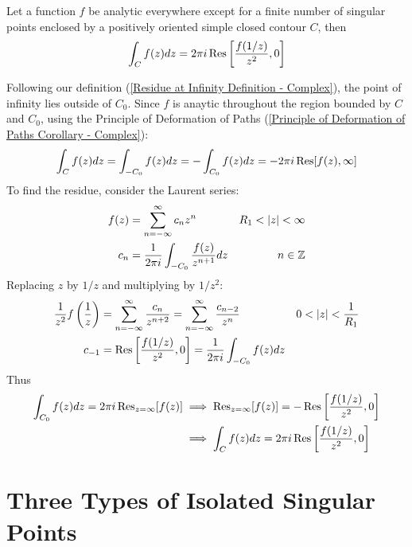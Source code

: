 \documentclass[12pt, english]{book}
\makeatletter
\renewenvironment{proof}[1][\proofname]{\par
	\pushQED{\qed}%
	\normalfont \topsep6\p@\@plus6\p@\relax
	\list{}{%
		\settowidth{\leftmargin}{\itshape\proofname:\hskip\labelsep}%
		\setlength{\labelwidth}{0pt}%
		\setlength{\itemindent}{-\leftmargin}%
	}%
	\item[\hskip\labelsep\itshape#1\@addpunct{:}]\ignorespaces
	}{ \popQED\endlist\@endpefalse}
\makeatother
\begin{document}
	\begin{theorem}
		Let a function \(f\) be analytic everywhere except for a finite number of singular points enclosed by a positively oriented simple closed contour \(C\), then \begin{align*}
			\int_{C} f(z) dz 
			= 2\pi i \Res \left[ \frac{f(1/z)}{z^2}, 0 \right]
		\end{align*}
	\end{theorem}
	\begin{proof}
		Following our definition (\cref{Residue at Infinity Definition - Complex}), the point of infinity lies outside of \(C_0\). Since \(f\) is anaytic throughout the region bounded by \(C\) and \(C_0\), using the Principle of Deformation of Paths (\cref{Principle of Deformation of Paths Corollary - Complex}):
		\begin{align*}
			\int_{C} f(z) dz = \int_{-C_0} f(z) dz = - \int_{C_0} f(z) dz = -2\pi i \Res[f(z), \infty]
		\end{align*}
		To find the residue, consider the Laurent series:
		\begin{align*}
			f(z) &= \sum_{n=-\infty}^{\infty} c_n z^n & R_1 < \abs{z} < \infty \\
			c_n &= \frac{1}{2\pi i} \int_{-C_0} \frac{f(z)}{z^{n+1}} dz & n \in \mathbb{Z}
		\end{align*}
		Replacing \(z\) by \(1/z\) and multiplying by \(1/z^2\):
		\begin{align*}
			\frac{1}{z^2} f\left(\frac{1}{z}\right)
			&= \sum_{n=-\infty}^{\infty} \frac{c_n}{z^{n+2}} = \sum_{n=-\infty}^{\infty} \frac{c_{n-2}}{z^n} & 0 < \abs{z} < \frac{1}{R_1} \\
			c_{-1} &= \Res\left[\frac{f(1/z)}{z^2}, 0\right] = \frac{1}{2\pi i} \int_{-C_0} f(z) dz
		\end{align*}
		Thus
		\begin{align*}
			\int_{C_0} f(z) dz = 2\pi i \Res_{z=\infty}[f(z)]
			&\implies
			\Res_{z = \infty}[f(z)] = -\Res\left[\frac{f(1/z)}{z^2}, 0\right] \\
			&\implies
			\int_{C} f(z) dz = 2\pi i \Res\left[\frac{f(1/z)}{z^2}, 0\right]
		\end{align*}
	\end{proof}
	
	\section{Three Types of Isolated Singular Points} \label{Three Types of Isolated Singular Points Section - Complex}
	
\end{document}
